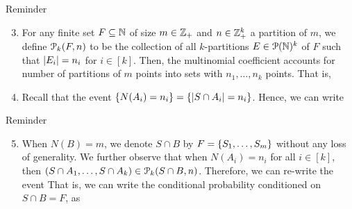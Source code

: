 \documentclass[12pt,aspectratio=169]{beamer}
\begin{document}
\begin{frame}
\begin{block}{Reminder}
\begin{enumerate}[i\_]
\setcounter{enumi}{2}
\item For any finite set $F\subseteq \mathbb{N}$ of size $m \in \mathbb{Z}_+$ and $n\in\mathbb{Z}_+^k$ a partition of $m$, 
we define $\mathcal{P}_k(F, n)$ to be the collection of all $k$-partitions $E \in \mathcal{P}(\mathbb{N})^k$ of $F$ such that $\left\lvert E_i\right\rvert = n_i$ for $i \in [k]$. 
Then, the multinomial coefficient accounts for number of partitions of $m$ points into sets with $n_1,  \dots, n_k$ points. 
That is, 

\item %
Recall that the event $\left\{N(A_i) = n_i\right\} = \left\{\left\lvert S \cap A_i\right\rvert = n_i\right\}$. 
Hence, we can write 
\end{enumerate}
\end{block}
\end{frame}

\begin{frame}
\begin{block}{Reminder}
\begin{enumerate}[i\_]
\setcounter{enumi}{4}
\item 
When $N(B) = m$, we denote $S\cap B$ by $F = \left\{S_1, \dots, S_m\right\}$ without any loss of generality. 
We further observe that when $N(A_i) = n_i$ for all $i \in [k]$, 
then $(S \cap A_1, \dots, S \cap A_k) \in \mathcal{P}_k(S\cap B,n)$. 
Therefore, we can re-write the event 
That is, we can write the conditional probability conditioned on $S\cap B = F$, as 
\end{enumerate}
\end{block}
\end{frame}
\end{document}
